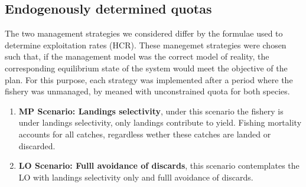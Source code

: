 \documentclass[12pt,oneline,a4paper,numbib]{ouparticle}
\numberwithin{equation}{subsection} %
\begin{document}
\subsection{Endogenously determined quotas}
\label{sec2.3}

The two management strategies we considered differ by the formulae used to determine exploitation rates (HCR). These manegemet strategies were chosen such that, if  the  management  model  was  the  correct  model  of  reality,  the corresponding  equilibrium  state  of  the  system  would  meet  the  objective  of  the  plan. For this purpose, each strategy was implemented after a period where the fishery was unmanaged, by meaned with unconstrained quota for both species.



\begin{table}[!h]
\centering
\caption{}
\label{scenarios}
\end{table}
 
\begin{enumerate}

\item
\textbf{MP Scenario: Landings selectivity},  under this scenario the fishery is under landings selectivity, only landings contribute to yield. Fishing mortality accounts for all catches, regardless wether these catches are landed or discarded.

\item
\textbf{LO Scenario: Fulll avoidance of discards}, this scenario contemplates the LO with landings selectivity only and fulll avoidance of discards.


\end{enumerate}
\end{document}
